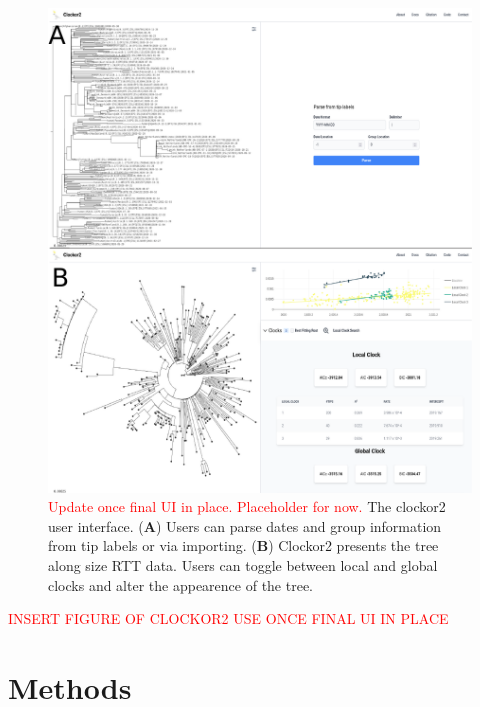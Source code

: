 \documentclass{article}
\begin{document}
\begin{figure}[H]
\centering
\includegraphics[width = 1\linewidth]{figures/clockor2UI.pdf}
\caption{\textcolor{red}{Update once final UI in place. Placeholder for now.} The clockor2 user interface. (\textbf{A}) Users can parse dates and group information from tip labels or via importing. (\textbf{B}) Clockor2 presents the tree along size RTT data. Users can toggle between local and global clocks and alter the appearence of the tree.}
\label{fig:ui}
\end{figure}

\textcolor{red}{INSERT FIGURE OF CLOCKOR2 USE ONCE FINAL UI IN PLACE}

\section*{Methods}
\end{document}
